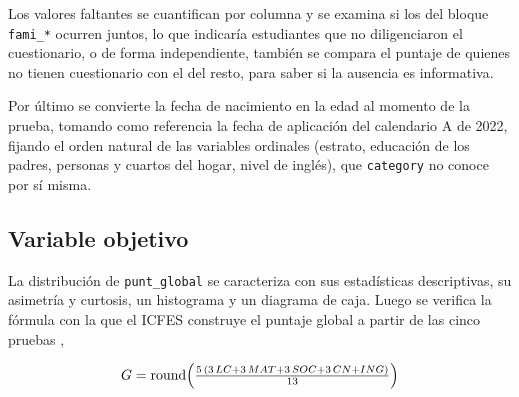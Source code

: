         \vspace{10pt}

        

        \vspace{10pt}

        Los valores faltantes se cuantifican por columna y se examina si los del
        bloque \texttt{fami\_*} ocurren juntos, lo que indicaría estudiantes que
        no diligenciaron el cuestionario, o de forma independiente, también se
        compara el puntaje de quienes no tienen cuestionario con el del resto,
        para saber si la ausencia es informativa.

        \vspace{10pt}

        

        \vspace{10pt}

        Por último se convierte la fecha de nacimiento en la edad al momento de
        la prueba, tomando como referencia la fecha de aplicación del calendario 
        A de 2022, fijando el orden natural de las variables ordinales (estrato,
        educación de los padres, personas y cuartos del hogar, nivel de inglés),
        que \texttt{category} no conoce por sí misma.

        \vspace{10pt}

        

    \subsection{Variable objetivo}
        La distribución de \texttt{punt\_global} se caracteriza con sus
        estadísticas descriptivas, su asimetría y curtosis, un histograma y un
        diagrama de caja. Luego se verifica la fórmula con la que el ICFES
        construye el puntaje global a partir de las cinco pruebas
        \cite{icfes2022guia},

        \vspace{10pt}

        \begin{equation}
            \label{global_formula}
            \scalebox{1}{$
                G = \operatorname{round}\!\left(\frac{5\,(3\,LC + 3\,MAT + 3\,SOC + 3\,CN + ING)}{13}\right)
            $}
        \end{equation}

